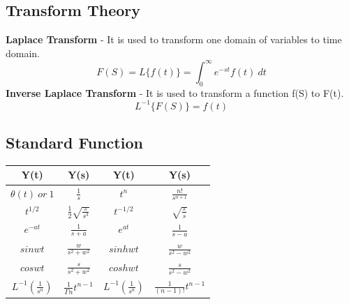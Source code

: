 \subsection{Transform Theory}
\textbf{Laplace Transform} - It is used to transform one domain of variables to time domain.
\[F(S)=L\{f(t)\}=\int_0^{\infty}e^{-st}f(t)\ dt\]
\textbf{Inverse Laplace Transform} - It is used to transform a function f(S) to F(t).
\[L^{-1}\{F(S)\}=f(t)\]

\subsection*{Standard Function}
\begin{table}[h!]
\centering
\setlength{\tabcolsep}{1em}
\tabulinesep=2mm
\begin{tabu}{|c|c|c|c|}
\hline
\textbf{Y(t)}                             & \textbf{Y(s)}                     & \textbf{Y(t)}                             & \textbf{Y(s)}                \\ \hline
\(\theta(t)\ or\ 1\)                      & \(\frac{1}{s}\)                   & \(t^n\)                                   & \(\frac{n!}{s^{n+1}}\)        \\ \hline
\(t^{1/2}\)                               & \(\frac{1}{2}\sqrt{\frac{\pi}{s^3}}\) & \(t^{-1/2}\)                             & \(\sqrt{\frac{\pi}{s}} \)     \\ \hline
\(e^{-at}\)                               & \(\frac{1}{s+a}\)                     & \(e^{at}\)                                & \(\frac{1}{s-a}\)                \\ \hline
\(sinwt\)                                 & \(\frac{w}{s^2+w^2}\)             & \(sinhwt\)                                & \(\frac{w}{s^2-w^2}\)        \\ \hline
\(coswt\)                                 & \(\frac{s}{s^2+w^2}\)             & \(coshwt\)                                & \(\frac{s}{s^2-w^2}\)        \\ \hline
\(L^{-1}\left(\frac{1}{s^n}\right) \) & \(\frac{1}{\Gamma n}t^{n-1}\)     & \(L^{-1}\left(\frac{1}{s^n}\right)\) & \(\frac{1}{(n-1)!}t^{n-1}\) \\ \hline
\end{tabu}
\end{table}

